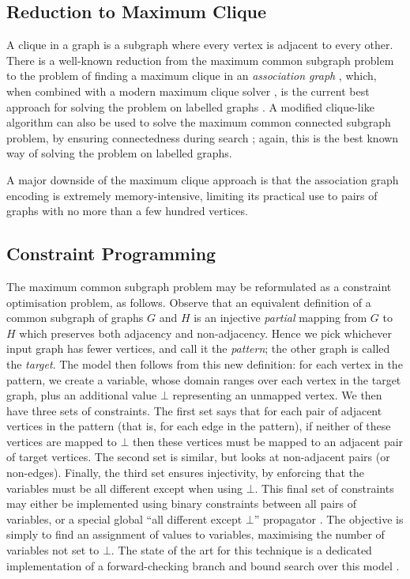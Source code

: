 \documentclass[sigconf]{acmart}
\begin{document}
\subsection{Reduction to Maximum Clique}

A clique in a graph is a subgraph where every vertex is adjacent to every other. There is a
well-known reduction from the maximum common subgraph problem to the problem of finding a maximum
clique in an \emph{association graph}
\citep{o:Levi73,DBLP:journals/jcamd/RaymondW02a,DBLP:conf/cp/McCreeshNPS16}, which, when combined with
a modern maximum clique solver \citep{DBLP:journals/ol/SegundoMRH13}, is the current best approach for
solving the problem on labelled graphs \citep{DBLP:conf/cp/McCreeshNPS16}. A modified clique-like
algorithm can also be used to solve the maximum common connected subgraph problem, by ensuring
connectedness during search \citep{DBLP:conf/cp/McCreeshNPS16}; again, this is the best known way of
solving the problem on labelled graphs.

A major downside of the maximum clique approach is that the association graph encoding is extremely
memory-intensive, limiting its practical use to pairs of graphs with no more than a few hundred
vertices.

\subsection{Constraint Programming}

The maximum common subgraph problem may be reformulated as a constraint optimisation problem, as
follows.  Observe that an equivalent definition of a common subgraph of graphs $G$ and $H$ is an
injective \emph{partial} mapping from $G$ to $H$ which preserves both adjacency and non-adjacency.
Hence we pick whichever input graph has fewer vertices, and call it the \emph{pattern}; the other
graph is called the \emph{target}. The model then follows from this new definition: for each vertex
in the pattern, we create a variable, whose domain ranges over each vertex in the target graph, plus
an additional value $\bot$ representing an unmapped vertex. We then have three sets of constraints.
The first set says that for each pair of adjacent vertices in the pattern (that is, for each edge in
the pattern), if neither of these vertices are mapped to $\bot$ then these vertices must be mapped
to an adjacent pair of target vertices. The second set is similar, but looks at non-adjacent pairs
(or non-edges).  Finally, the third set ensures injectivity, by enforcing that the variables must be
all different except when using $\bot$. This final set of constraints may either be implemented
using binary constraints between all pairs of variables, or a special global ``all different except
$\bot$'' propagator \citep{DBLP:conf/cp/PetitRB01}. The objective is simply to find an assignment of
values to variables, maximising the number of variables not set to $\bot$. The state of the art for
this technique is a dedicated implementation of a forward-checking branch and bound search over this
model \citep{DBLP:conf/cp/NdiayeS11,DBLP:conf/cp/McCreeshNPS16}.
\end{document}
